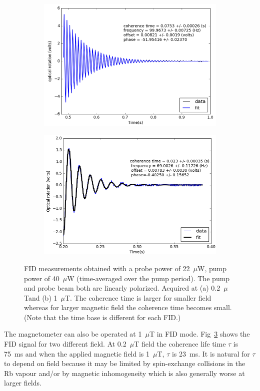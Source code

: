 \begin{figure}
  \centering  
  \begin{subfigure}[b]{0.45\textwidth}
    \centering
    \includegraphics[width=\textwidth]{figures/FID_0_2_micro_tesla}
    \caption{}
    \label{fig:small field}
  \end{subfigure}
  \hfill
  \begin{subfigure}[b]{0.45\textwidth}
    \centering
    \includegraphics[width=\textwidth]{figures/FID_1_micro_tesla}
    \caption{}
    \label{fig:1 micro tesla}
  \end{subfigure}
  \caption{FID measurements obtained with a probe power of 22~$\mu$W,
    pump power of 40~$\mu$W (time-averaged over the pump period). The
    pump and probe beam both are linearly polarized.  Acquired at (a)
    0.2~$\mu$Tand (b) 1~$\mu$T.  The coherence time is larger for
    smaller field whereas for larger magnetic field the coherence time
    becomes small.  (Note that the time base is different for each
    FID.)}
    \label{fig:graphs}
\end{figure}
The magnetometer can also be operated at 1~$\mu$T in FID mode.
Fig~\ref{fig:graphs} shows the FID signal for two different field.  At
0.2~$\mu$T field the coherence life time $\tau$ is 75~ms and when the
applied magnetic field is 1~$\mu$T, $\tau$ is 23~ms.  It is natural
for $\tau$ to depend on field because it may be limited by
spin-exchange collisions in the Rb vapour and/or by magnetic
inhomogeneity which is also generally worse at larger fields.


